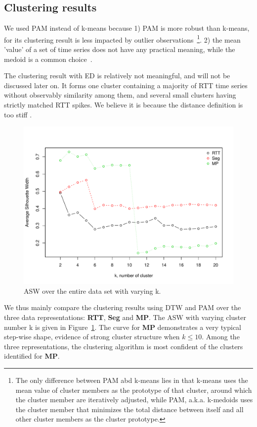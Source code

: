 \subsection{Clustering results}

We used \ac{PAM} instead of k-means because 1) \ac{PAM} is more robust than k-means, for its clustering result is less impacted by outlier observations~\footnote{The only difference between \ac{PAM} abd k-means lies in that k-means uses the mean value of cluster members as the prototype of that cluster, around which the cluster member are iteratively adjusted, while \ac{PAM}, a.k.a. k-medoids uses the cluster member that minimizes the total distance between itself and all other cluster members as the cluster prototype.}.
2) the mean 'value' of a set of time series does not have any practical meaning, while the medoid is a common choice~\cite{Aghabozorgi2015}. 

The clustering result with \ac{ED} is relatively not meaningful, and will not be discussed later on. It forms one cluster containing a majority of RTT time series without observably similarity among them, and several small clusters having strictly matched RTT spikes. We believe it is because the distance definition is too stiff .

\begin{figure}[!htb]
\centering
\includegraphics[width=.8\textwidth]{gfx/chap3/sil_comp.pdf}
\caption{\ac{ASW} over the entire data set with varying k.}
\label{fig:sil_comp}
\end{figure}
We thus mainly compare the clustering results using \ac{DTW} and \ac{PAM} over the three data representations: \textbf{RTT}, \textbf{Seg} and \textbf{MP}. The \ac{ASW} with varying cluster number k is given in Figure~\ref{fig:sil_comp}. The curve for \textbf{MP} demonstrates a very typical step-wise shape, evidence of strong cluster structure when $k \leq 10$. Among the three representations, the clustering algorithm is most confident of the clusters identified for \textbf{MP}.

